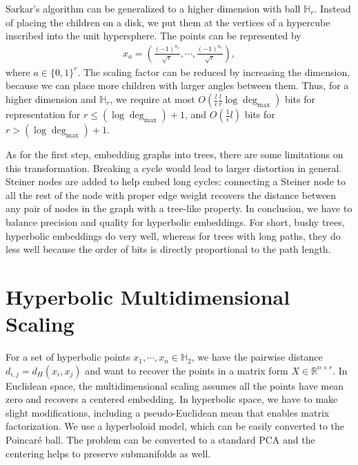 Sarkar's algorithm can be generalized to a higher dimension with ball $\mathbb{H}_r$. Instead of placing the children on a disk, we put them at the vertices of a hypercube inscribed into the unit hypersphere. The points can be represented by
\begin{align*}
    x_a = \left(\frac{(-1)^{a_1}}{\sqrt{r}}, \cdots, \frac{(-1)^{a_r}}{\sqrt{r}}\right),
\end{align*}
where $a \in \{0, 1\}^r$. The scaling factor can be reduced by increasing the dimension, because we can place more children with larger angles between them. Thus, for a higher dimension and $\mathbb{H}_r$, we require at most $O(\frac{l}{\epsilon} \frac{l}{r} \log \deg_{\max})$ bits for representation for $r \leq (\log \deg_{\max}) + 1$, and $O(\frac{1}{\epsilon}l)$ bits for $r > (\log \deg_{\max}) + 1$.  

As for the first step, embedding graphs into trees, there are some limitations on this transformation. Breaking a cycle would lead to larger distortion in general. Steiner nodes are added to help embed long cycles: connecting a Steiner node to all the rest of the node with proper edge weight recovers the distance between any pair of nodes in the graph with a tree-like property. In conclusion, we have to balance precision and quality for hyperbolic embeddings. For short, bushy trees, hyperbolic embeddings do very well, whereas for trees with long paths, they do less well because the order of bits is directly proportional to the path length. 

\section{Hyperbolic Multidimensional Scaling}

For a set of hyperbolic points $x_1, \cdots, x_n \in \mathbb{H}_2$, we have the pairwise distance $d_{i, j} = d_H(x_i, x_j)$ and want to recover the points in a matrix form $X \in \mathbb{R}^{n \times r}$. In Euclidean space, the multidimensional scaling assumes all the points have mean zero and recovers a centered embedding. In hyperbolic space, we have to make slight modifications, including a pseudo-Euclidean mean that enables matrix factorization. We use a hyperboloid model, which can be easily converted to the Poincar\'e ball. The problem can be converted to a standard PCA and the centering helps to preserve submanifolds as well.

